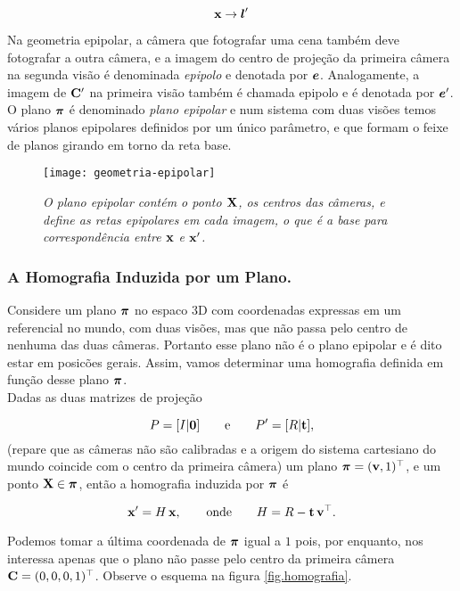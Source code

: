 \begin{equation*}
\mathbf{x}\rightarrow\boldsymbol{l}'
\end{equation*}

Na geometria epipolar, a câmera que fotografar uma cena também deve fotografar a outra câmera, e a imagem do centro de projeção da primeira câmera na segunda visão é denominada \textit{epipolo} e denotada por $\boldsymbol{e}$. Analogamente, a imagem de ${\bf C}'$ na primeira visão também é chamada epipolo e é denotada por $\boldsymbol{e}'$.
O plano $\boldsymbol{\pi}$ é denominado \textit{plano epipolar} e num sistema com duas visões temos vários planos epipolares definidos por um único parâmetro, e que formam o feixe de planos girando em torno da reta base.

\begin{figure}[!htb]
\centering
\texttt{[image: geometria-epipolar]}
\caption{\textit{O plano epipolar contém o ponto $\mathbf{X}$, os centros das câmeras, e define as retas epipolares em cada imagem, o que é a base para correspondência entre $\mathbf{x}$ e $\mathbf{x}'$.}}
\label{fig.geo-epipolar}
\end{figure}

\subsubsection{A Homografia Induzida por um Plano.}\label{sec.homografia}

Considere um plano $\boldsymbol{\pi}$ no espaco 3D com coordenadas expressas em um referencial no mundo, com duas visões, mas que não passa pelo centro de nenhuma das duas câmeras. Portanto esse plano não é o plano epipolar e é dito estar em posicões gerais. Assim, vamos determinar uma homografia definida em função desse plano $\boldsymbol{\pi}$.\\

Dadas as duas matrizes de projeção 

\begin{equation*}
P=[I|{\bf 0}]\qquad\text{e}\qquad P'=[R|{\bf t}],
\end{equation*}
(repare que as câmeras não são calibradas e a origem do sistema cartesiano do mundo coincide com o centro da primeira câmera) um plano $\boldsymbol{\pi}=({\bf v},1)^\top$, e um ponto $\mathbf{X}\in\boldsymbol{\pi}$, então a homografia induzida por $\boldsymbol{\pi}$ é

\begin{equation*}
\mathbf{x}'=H\,\mathbf{x},\qquad\text{onde}\qquad H=R-{\bf t}\,{\bf v}^\top.
\end{equation*}

Podemos tomar a última coordenada de $\boldsymbol{\pi}$ igual a $1$ pois, por enquanto, nos interessa apenas que o plano não passe pelo centro da primeira câmera ${\bf C}=(0,0,0,1)^\top$. Observe o esquema na figura \ref{fig.homografia}. 

